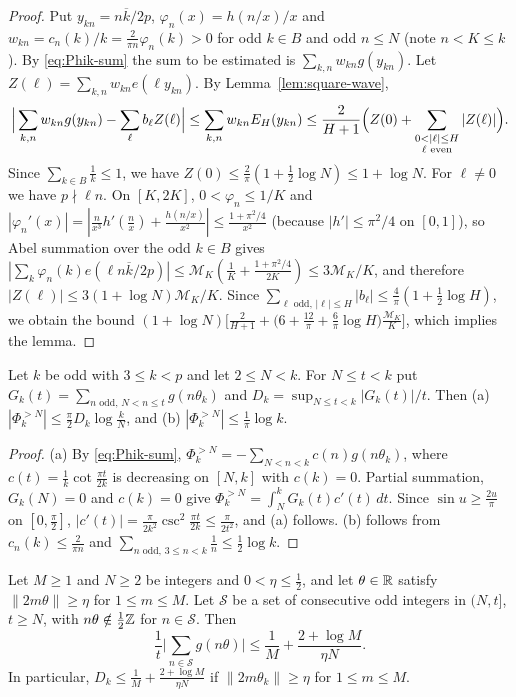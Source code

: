 \begin{proof}
Put $y_{kn}=n\overline{k}/2p$, $\varphi_n(x)=h(n/x)/x$ and $w_{kn}=c_n(k)/k=\frac2{\pi n}\varphi_n(k)>0$ for odd
$k\in B$ and odd $n\le N$ (note $n<K\le k$). By \eqref{eq:Phik-sum} the sum to be estimated is
$\sum_{k,n}w_{kn}g(y_{kn})$. Let $Z(\ell)=\sum_{k,n}w_{kn}e(\ell y_{kn})$. By Lemma~\ref{lem:square-wave},
\[
\Big|\sum_{k,n}w_{kn}g(y_{kn})-\sum_\ell b_\ell Z(\ell)\Big|\le\sum_{k,n}w_{kn}E_H(y_{kn})\le\frac2{H+1}\Bigl(Z(0)+
\sum_{\substack{0<|\ell|\le H\\ \ell\text{ even}}}|Z(\ell)|\Bigr).
\]
Since $\sum_{k\in B}\frac1k\le1$, we have $Z(0)\le\frac2\pi(1+\frac12\log N)\le1+\log N$. For $\ell\ne0$ we have
$p\nmid\ell n$. On $[K,2K]$, $0<\varphi_n\le1/K$ and
$|\varphi_n'(x)|=|\frac n{x^3}h'(\frac nx)+\frac{h(n/x)}{x^2}|\le\frac{1+\pi^2/4}{x^2}$ (because $|h'|\le\pi^2/4$ on
$[0,1]$), so Abel summation over the odd $k\in B$ gives
$|\sum_k\varphi_n(k)e(\ell n\overline{k}/2p)|\le\mathcal{M}_K(\frac1K+\frac{1+\pi^2/4}{2K})\le3\mathcal{M}_K/K$, and
therefore $|Z(\ell)|\le3(1+\log N)\mathcal{M}_K/K$. Since $\sum_{\ell\text{ odd},\,|\ell|\le H}|b_\ell|\le\frac4\pi(1+
\frac12\log H)$, we obtain the bound $(1+\log N)\bigl[\frac2{H+1}+\bigl(6+\frac{12}\pi+\frac6\pi\log H\bigr)
\frac{\mathcal{M}_K}{K}\bigr]$, which implies the lemma.
\end{proof}

\begin{lemma}[Tails]\label{lem:tails}
Let $k$ be odd with $3\le k<p$ and let $2\le N<k$. For $N\le t<k$ put $G_k(t)=\sum_{n\text{ odd},\,N<n\le t}g(n\theta_k)$
and $D_k=\sup_{N\le t<k}|G_k(t)|/t$. Then \textup{(a)} $|\Phi_k^{>N}|\le\frac\pi2D_k\log\frac kN$, and
\textup{(b)} $|\Phi_k^{>N}|\le\frac1\pi\log k$.
\end{lemma}

\begin{proof}
(a) By \eqref{eq:Phik-sum}, $\Phi_k^{>N}=-\sum_{N<n<k}c(n)g(n\theta_k)$, where $c(t)=\frac1k\cot\frac{\pi t}{2k}$ is
decreasing on $[N,k]$ with $c(k)=0$. Partial summation, $G_k(N)=0$ and $c(k)=0$ give
$\Phi_k^{>N}=\int_N^kG_k(t)c'(t)\,dt$. Since $\sin u\ge\frac{2u}\pi$ on $[0,\frac\pi2]$,
$|c'(t)|=\frac\pi{2k^2}\csc^2\frac{\pi t}{2k}\le\frac\pi{2t^2}$, and (a) follows. (b) follows from
$c_n(k)\le\frac2{\pi n}$ and $\sum_{n\text{ odd},\,3\le n<k}\frac1n\le\frac12\log k$.
\end{proof}

\begin{lemma}\label{lem:generic}
Let $M\ge1$ and $N\ge2$ be integers and $0<\eta\le\frac12$, and let $\theta\in\mathbb{R}$ satisfy $\|2m\theta\|\ge\eta$ for
$1\le m\le M$. Let $\mathcal{S}$ be a set of consecutive odd integers in $(N,t]$, $t\ge N$, with
$n\theta\notin\frac12\mathbb{Z}$ for $n\in\mathcal{S}$. Then
\[
\frac1t\Big|\sum_{n\in\mathcal{S}}g(n\theta)\Big|\le\frac1M+\frac{2+\log M}{\eta N}.
\]
In particular, $D_k\le\frac1M+\frac{2+\log M}{\eta N}$ if $\|2m\theta_k\|\ge\eta$ for $1\le m\le M$.
\end{lemma}

